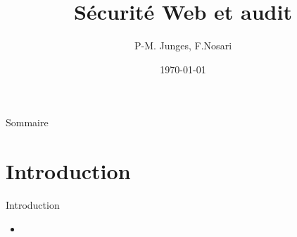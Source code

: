 \documentclass{beamer}
\title{Sécurité Web et audit}
\author{P-M. Junges, F.Nosari}
\institute{Faculté des Sciences et Technologies}
\date{\today}
\begin{document}
\begin{frame}
	\titlepage
\end{frame}

\begin{frame}{Sommaire}
	\tableofcontents
\end{frame}

\section{Introduction}
	\begin{frame}{Introduction}
		\begin{itemize}
			\item %
		\end{itemize}
	\end{frame}

\begin{comment}
	Ca me semble "complet" mais si on doit faire 15 mins de pres
	on risque de prendre pas mal de temps sur cette partie

	I Audit de sécurité
		Definition
			donner def + norme ISO
		Pré requis pour l'audit
			6 principes à respecter
		Preparer l’audit
			expliquer graphique de la page 5 de la norme ISO
		Execution de l’audit
			tests d'intrusion
				def boite blanche, noire, grise
				outils d'intrusion
			test de vulnerabilites
				Outils de tests de vulnerabilites
		Conclure audit
			donner recommendations sur ce qu'il faut changer etc

	En y réfléchissant on aurait moyen de faire notre presentation sur une seule partie
	qui serait donc la partie Audit de sécurité (pour un site web) et ensuite toute la partie
	faille(injection etc.) on en parlerai dans la partie Execution de l'audit.
	
	Réponse (Flo):
	
	Je pense que l'on ne peut pas juste faire sur l'audit car il y a l'aspect sécurité web. 
	Ton plan me parrait pas mal, c'est en gros ce que j'ai mis avec plus de détails donc j'aime bien.
	Je me demande ce que l'on va faire exactement comme démo.
	
	On peut essayé de faire un truc complet et on essaie de négocier 10 minutes de plus.

	Réponse (Pima):
	(mon clavier double les lettres qq fois, donc fait pas attention)

	Je pense que pour négocier du temps, c'est un peu cheaté^^.
	
	Ensuite, pour reparler de ta remarque: "Je pense que l'on ne peut pas juste faire sur l'audit car il y a l'aspect sécurité web".


\end{comment}
\end{document}
